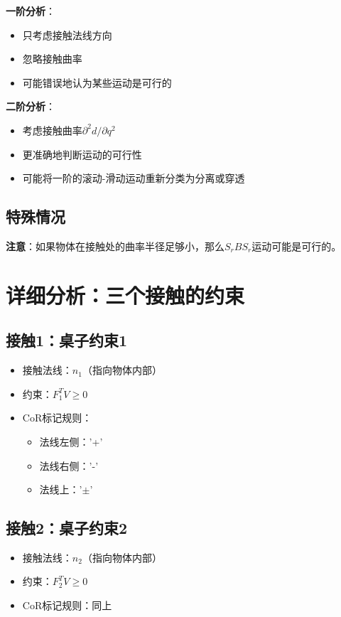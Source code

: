 \documentclass[12pt,a4paper]{article}
\begin{document}
\textbf{一阶分析}：
\begin{itemize}
\item 只考虑接触法线方向
\item 忽略接触曲率
\item 可能错误地认为某些运动是可行的
\end{itemize}

\textbf{二阶分析}：
\begin{itemize}
\item 考虑接触曲率$\partial^2 d/\partial q^2$
\item 更准确地判断运动的可行性
\item 可能将一阶的滚动-滑动运动重新分类为分离或穿透
\end{itemize}

\subsection{特殊情况}

\textbf{注意}：如果物体在接触处的曲率半径足够小，那么$S_rBS_r$运动可能是可行的。

\section{详细分析：三个接触的约束}

\subsection{接触1：桌子约束1}

\begin{itemize}
\item 接触法线：$\hat{n}_1$（指向物体内部）
\item 约束：$F_1^T V \geq 0$
\item CoR标记规则：
  \begin{itemize}
  \item 法线左侧：'+'
  \item 法线右侧：'-'
  \item 法线上：'$\pm$'
  \end{itemize}
\end{itemize}

\subsection{接触2：桌子约束2}

\begin{itemize}
\item 接触法线：$\hat{n}_2$（指向物体内部）
\item 约束：$F_2^T V \geq 0$
\item CoR标记规则：同上
\end{itemize}
\end{document}
